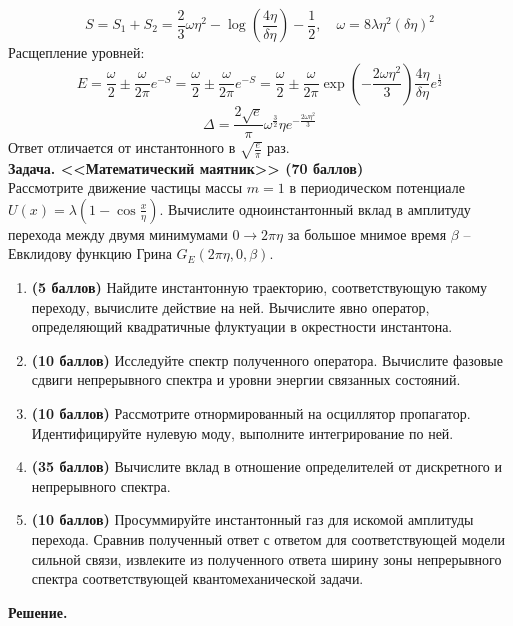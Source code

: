 \documentclass[12pt]{article}
\theoremstyle{definition}
\begin{document}
\begin{equation}
    S=S_1+S_2=\frac{2}{3}\omega\eta^2-\log\left(\frac{4\eta}{\delta\eta}\right)-\frac{1}{2},\quad\omega=8\lambda\eta^2(\delta\eta)^2
\end{equation}
Расщепление уровней:
\begin{equation}
    E=\frac{\omega}{2}\pm\frac{\omega}{2\pi}e^{-S}=\frac{\omega}{2}\pm\frac{\omega}{2\pi}e^{-S}=\frac{\omega}{2}\pm\frac{\omega}{2\pi}\exp\left(-\frac{2\omega\eta^2}{3}\right)\frac{4\eta}{\delta\eta}e^{\frac{1}{2}}
\end{equation}
\begin{equation}
    \boxed{\Delta=\frac{2\sqrt{e}}{\pi}\omega^\frac{3}{2}\eta e^{-\frac{2\omega\eta^2}{3}}}
\end{equation}
Ответ отличается от инстантонного в $\sqrt{\frac{e}{\pi}}$ раз.\\
\textbf{Задача. <<Математический маятник>> (70 баллов)}\\
Рассмотрите движение частицы массы $m = 1$ в периодическом потенциале $U(x) = \lambda(1-\cos\frac{x}{\eta})$. Вычислите одноинстантонный вклад в амплитуду перехода между двумя минимумами $0 \rightarrow 2\pi\eta$ за большое мнимое время $\beta$ -- Евклидову функцию Грина $G_E(2\pi\eta, 0, \beta)$.
\begin{enumerate}
    \item \textbf{(5 баллов)} Найдите инстантонную траекторию, соответствующую такому переходу, вычислите действие на ней.
    Вычислите явно оператор, определяющий квадратичные флуктуации в окрестности инстантона.
    \item \textbf{(10 баллов)} Исследуйте спектр полученного оператора. Вычислите фазовые сдвиги непрерывного спектра и уровни энергии связанных состояний.
    \item \textbf{(10 баллов)} Рассмотрите отнормированный на осциллятор пропагатор. Идентифицируйте нулевую моду, выполните интегрирование по ней.
    \item \textbf{(35 баллов)} Вычислите вклад в отношение определителей от дискретного и непрерывного спектра.
    \item \textbf{(10 баллов)} Просуммируйте инстантонный газ для искомой амплитуды перехода. Сравнив полученный ответ с ответом для соответствующей модели сильной связи, извлеките из полученного ответа ширину зоны непрерывного спектра соответствующей квантомеханической задачи.
\end{enumerate}
\textbf{Решение.}
\end{document}
